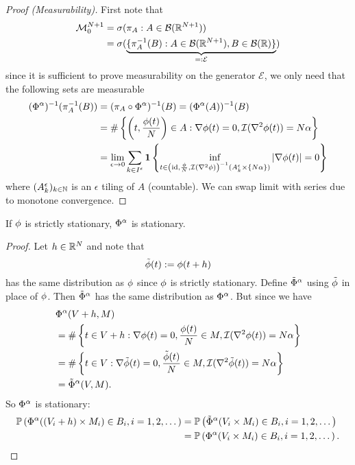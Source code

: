 \begin{proof}[Proof (Measurability)]
	First note that	
	\begin{align*}
		\locFiniteMeasAlg[\dimension+1]
		&= \sigma(\pi_A : A\in\borel(\real^{\dimension+1}))\\
		&=\sigma(\underbrace{
			\{\pi_A^{-1}(B) : A\in\borel(\real^{\dimension+1}), B\in\borel(\real)\}
		}_{=:\mathcal{E}}
		)
	\end{align*}
	since it is sufficient to prove measurability on the generator
	\(\mathcal{E}\), we only need that the following sets are measurable
	\begin{align*}
		(\crit^\alpha)^{-1}(\pi^{-1}_{ A }(B))
		&= (\pi_{A} \circ \crit^\alpha)^{-1}(B)
		= (\crit^\alpha(A))^{-1}(B)\\
		&= \#\left\{\left(t,\frac{\rf(t)}{\dimension}\right) \in A:
			\nabla\rf(t)=0,
			\negEV(\nabla^2 \rf(t))=\dimension\alpha
		\right\}\\
		&= \lim_{\epsilon\to 0} \sum_{k\in I^\epsilon}
		\ind\left\{
			\inf_{t\in \left(\text{id}, \frac{\rf}\dimension, \negEV(\nabla^2\rf)\right)^{-1}(A^\epsilon_k\times \{\dimension\alpha\}) }
		|\nabla \rf(t)| = 0
		\right\}
	\end{align*}
	where \((A^\epsilon_k)_{k\in\nat}\) is an \(\epsilon\) tiling of \(A\) (countable).
	We can swap limit with series due to monotone convergence.
\end{proof}

\begin{lemma}[Stationarity]
	If \(\rf\) is strictly stationary, \(\crit^\alpha\) is stationary.
\end{lemma}
\begin{proof}
	Let \(h\in \real^\dimension\) and note that
	\[
		\tilde{\rf}(t) := \rf(t+h)
	\]
	has the same distribution as \(\rf\) since \(\rf\) is strictly stationary. Define
	\(\tilde{\crit}^\alpha\) using \(\tilde{\rf}\) in place of \(\rf\). Then
	\(\tilde{\crit}^\alpha\) has the same distribution as \(\crit^\alpha\).
	But since we have
	\begin{align*}
		&\crit^\alpha(\Vol+h, M)\\
		&= \#\left\{t\in\Vol+h:
			\nabla\rf(t)=0,
			\frac{\rf(t)}{\dimension}\in M,
			\negEV(\nabla^2 \rf(t))=\dimension\alpha
		\right\}\\
		&= \#\left\{t\in\Vol:
			\nabla\tilde{\rf}(t)=0,
			\frac{\tilde{\rf}(t)}{\dimension}\in M,
			\negEV(\nabla^2 \tilde{\rf}(t))=\dimension\alpha
		\right\}\\
		&= \tilde{\crit}^\alpha(\Vol, M).
	\end{align*}
	So \(\crit^\alpha\) is stationary:
	\begin{align*}
		\Pr\left(\crit^\alpha((\Vol_i+h)\times M_i)\in B_i, i=1,2,\dots\right)
		&= \Pr\left(\tilde{\crit}^\alpha(\Vol_i\times M_i)\in B_i, i=1,2,\dots\right)\\
		&= \Pr\left(\crit^\alpha(\Vol_i\times M_i)\in B_i, i=1,2,\dots\right).
		\qedhere
	\end{align*}
\end{proof}




